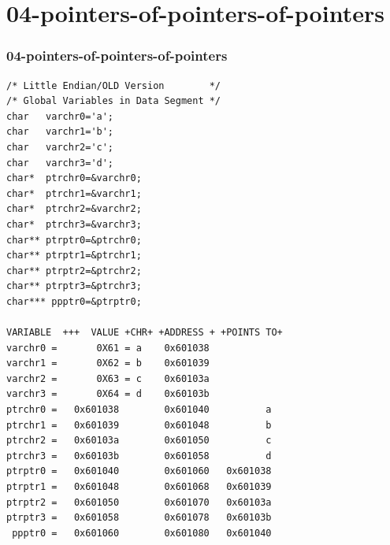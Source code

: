 \documentclass[aspectratio=169, xcolor=table, notheorems, hyperref={pdfpagelabels=false}]{beamer}
\begin{document}
\section{04-pointers-of-pointers-of-pointers}
\begin{frame}[fragile]
\frametitle{04-pointers-of-pointers-of-pointers}
\begin{lstlisting}[basicstyle=\ttfamily\tiny]
/* Little Endian/OLD Version        */
/* Global Variables in Data Segment */
char   varchr0='a';
char   varchr1='b';
char   varchr2='c';
char   varchr3='d';
char*  ptrchr0=&varchr0;
char*  ptrchr1=&varchr1;
char*  ptrchr2=&varchr2;
char*  ptrchr3=&varchr3;
char** ptrptr0=&ptrchr0;
char** ptrptr1=&ptrchr1;
char** ptrptr2=&ptrchr2;
char** ptrptr3=&ptrchr3;
char*** ppptr0=&ptrptr0;

VARIABLE  +++  VALUE +CHR+ +ADDRESS + +POINTS TO+ 
varchr0 =       0X61 = a    0x601038
varchr1 =       0X62 = b    0x601039
varchr2 =       0X63 = c    0x60103a
varchr3 =       0X64 = d    0x60103b
ptrchr0 =   0x601038        0x601040          a
ptrchr1 =   0x601039        0x601048          b
ptrchr2 =   0x60103a        0x601050          c
ptrchr3 =   0x60103b        0x601058          d
ptrptr0 =   0x601040        0x601060   0x601038
ptrptr1 =   0x601048        0x601068   0x601039
ptrptr2 =   0x601050        0x601070   0x60103a
ptrptr3 =   0x601058        0x601078   0x60103b
 ppptr0 =   0x601060        0x601080   0x601040
\end{lstlisting}

\end{frame}
\end{document}
